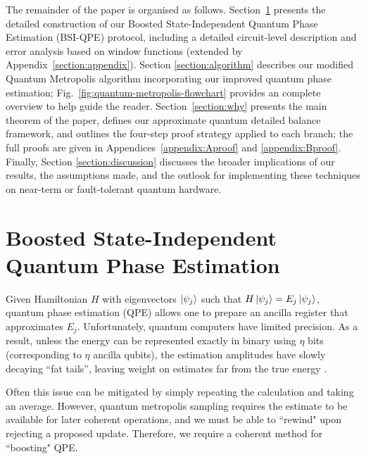 \documentclass[aps,floatfix,10pt,amssymb,amsfont,amsmath,superscriptaddress,float,nofootinbib,longbibliography,nobalancelastpage,twocolumn]{revtex4-2}
\begin{document}
The remainder of the paper is organised as follows. Section~\ref{section:boostedphaseestimation} presents the detailed construction of our Boosted State-Independent Quantum Phase Estimation (BSI-QPE) protocol, including a detailed circuit-level description and error analysis based on window functions (extended by Appendix~\ref{section:appendix}). Section \ref{section:algorithm} describes our modified Quantum Metropolis algorithm incorporating our improved quantum phase estimation; Fig.~\ref{fig:quantum-metropolis-flowchart} provides an complete overview to help guide the reader. Section~\ref{section:why} presents the main theorem of the paper, defines our approximate quantum detailed balance framework, and outlines the four-step proof strategy applied to each branch; the full proofs are given in Appendices~\ref{appendix:Aproof} and \ref{appendix:Bproof}. Finally, Section \ref{section:discussion} discusses the broader implications of our results, the assumptions made, and the outlook for implementing these techniques on near-term or fault-tolerant quantum hardware.


\section{Boosted State-Independent Quantum Phase Estimation}
\label{section:boostedphaseestimation}

Given Hamiltonian $H$ with eigenvectors $\ket{\psi_j}$ such that $H\ket{\psi_j} = E_j \ket{\psi_j}$, quantum phase estimation (QPE) allows one to prepare an ancilla register that approximates $E_j$. Unfortunately, quantum computers have limited precision. As a result, unless the energy can be represented exactly in binary using $\eta$ bits (corresponding to $\eta$ ancilla qubits), the estimation amplitudes have slowly decaying ``fat tails'', leaving weight on estimates far from the true energy \cite{Nielsen_Chuang_2010}.

Often this issue can be mitigated by simply repeating the calculation and taking an average. However, quantum metropolis sampling requires the estimate to be available for later coherent operations, and we must be able to ``rewind" upon rejecting a proposed update. Therefore, we require a coherent method for ``boosting" QPE. 
\end{document}
